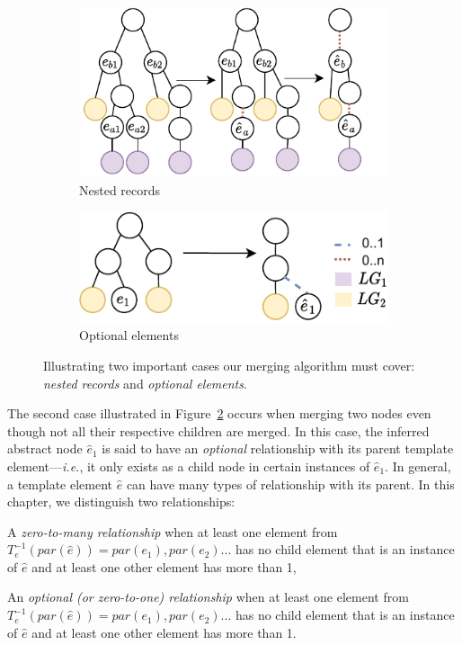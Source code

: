 \begin{figure}[ht]
  \centering
  \begin{subfigure}{0.4\textwidth}
    \centering
    \includegraphics[width=.9\linewidth]{appstract/explanations/intra-recursivity}
    \caption{Nested records}
    \label{fig:nested_records}
  \end{subfigure}
  \begin{subfigure}{0.4\textwidth}
    \centering 
    \includegraphics[width=.9\linewidth]{appstract/explanations/intra-optional}
    \caption{Optional elements}
    \label{fig:optional_elements}
  \end{subfigure}
  \caption{Illustrating two important cases our merging algorithm must cover: \emph{nested records} and \emph{optional elements}.}
  \label{fig:intra-use-cases}
\end{figure}

The second case illustrated in Figure~\ref{fig:optional_elements} occurs when merging two nodes even though not all their respective children are merged.
In this case, the inferred abstract node $\hat{e}_1$ is said to have an \textit{optional} relationship with its parent template element---\emph{i.e.}, it only exists as a child node in certain instances of $\hat{e}_1$.
In general, a template element $\hat{e}$ can have many types of relationship with its parent.
In this chapter, we distinguish two relationships:
\begin{compactitem}
    \item A \emph{zero-to-many relationship} when at least one element from $T^{-1}_e(par(\hat{e})) = par(e_1), par(e_2)...$ has no child element that is an instance of $\hat{e}$ and at least one other element has more than 1,
    \item An \emph{optional (or zero-to-one) relationship} when at least one element from $T^{-1}_e(par(\hat{e})) = par(e_1), par(e_2)...$ has no child element that is an instance of $\hat{e}$ and at least one other element has more than 1.
\end{compactitem}

